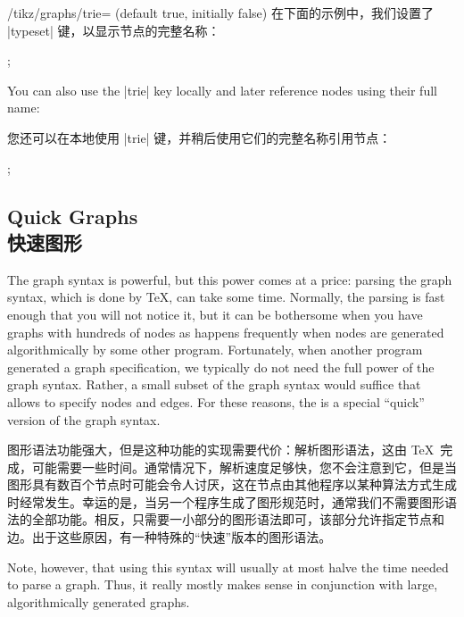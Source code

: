 \begin{key}{/tikz/graphs/trie= (default true, initially false)}
    在下面的示例中，我们设置了 |typeset| 键，以显示节点的完整名称：
\begin{codeexample}[preamble={\usetikzlibrary{graphs,graphdrawing}\usegdlibrary{layered}}]
\tikz {};
\end{codeexample}
\fi
    You can also use the |trie| key locally and later reference nodes using
    their full name:
    
    您还可以在本地使用 |trie| 键，并稍后使用它们的完整名称引用节点：
\begin{codeexample}[preamble={\usetikzlibrary{graphs}}]
\tikz {};
\end{codeexample}
\end{key}


\subsection{Quick Graphs\\快速图形}
\label{section-library-graphs-quick}

The graph syntax is powerful, but this power comes at a price: parsing the
graph syntax, which is done by \TeX, can take some time. Normally, the parsing
is fast enough that you will not notice it, but it can be bothersome when you
have graphs with hundreds of nodes as happens frequently when nodes are
generated algorithmically by some other program. Fortunately, when another
program generated a graph specification, we typically do not need the full
power of the graph syntax. Rather, a small subset of the graph syntax would
suffice that allows to specify nodes and edges. For these reasons, the is a
special ``quick'' version of the graph syntax.

图形语法功能强大，但是这种功能的实现需要代价：解析图形语法，这由 \TeX\ 完成，可能需要一些时间。通常情况下，解析速度足够快，您不会注意到它，但是当图形具有数百个节点时可能会令人讨厌，这在节点由其他程序以某种算法方式生成时经常发生。幸运的是，当另一个程序生成了图形规范时，通常我们不需要图形语法的全部功能。相反，只需要一小部分的图形语法即可，该部分允许指定节点和边。出于这些原因，有一种特殊的“快速”版本的图形语法。

Note, however, that using this syntax will usually at most halve the time
needed to parse a graph. Thus, it really mostly makes sense in conjunction with
large, algorithmically generated graphs.

